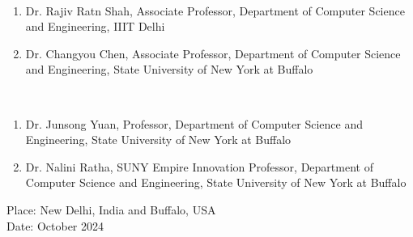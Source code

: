 \begin{singlespacing}
{
 \\
\begin{enumerate}
    \item Dr. Rajiv Ratn Shah, Associate Professor, Department of Computer Science and Engineering, IIIT Delhi
    \item Dr. Changyou Chen, Associate Professor, Department of Computer Science and Engineering, State University of New York at Buffalo
\end{enumerate}


 \\
\begin{enumerate}
    \item Dr. Junsong Yuan, Professor, Department of Computer Science and Engineering, State University of New York at Buffalo
    \item Dr. Nalini Ratha, SUNY Empire Innovation Professor, Department of Computer Science and Engineering, State University of New York at Buffalo
\end{enumerate}



\noindent Place: New Delhi, India and Buffalo, USA\\
\noindent Date: October 2024
} 
\end{singlespacing}
\vspace*{0.25in}

